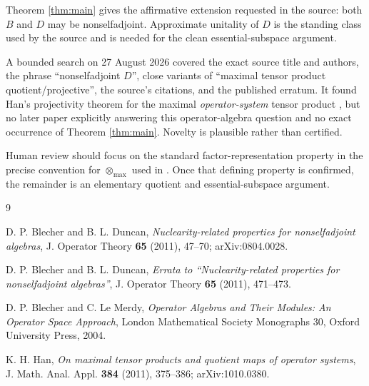 \documentclass[11pt]{article}
\newcommand{\otmax}{\mathbin{\otimes_{\max}}}
\begin{document}
Theorem \ref{thm:main} gives the affirmative extension requested in the
source: both $B$ and $D$ may be nonselfadjoint.  Approximate unitality of $D$
is the standing class used by the source and is needed for the clean
essential-subspace argument.

A bounded search on 27 August 2026 covered the exact source title and authors,
the phrase ``nonselfadjoint $D$'', close variants of ``maximal tensor product
quotient/projective'', the source's citations, and the published erratum.  It
found Han's projectivity theorem for the maximal \emph{operator-system}
tensor product \cite{Han}, but no later paper explicitly answering this
operator-algebra question and no exact occurrence of Theorem \ref{thm:main}.
Novelty is plausible rather than certified.

Human review should focus on the standard factor-representation property in
the precise convention for $\otmax$ used in \cite{BlecherDuncan}.  Once that
defining property is confirmed, the remainder is an elementary quotient and
essential-subspace argument.

\begin{thebibliography}{9}

D. P. Blecher and B. L. Duncan,
\emph{Nuclearity-related properties for nonselfadjoint algebras},
J. Operator Theory \textbf{65} (2011), 47--70;
arXiv:0804.0028.

D. P. Blecher and B. L. Duncan,
\emph{Errata to ``Nuclearity-related properties for nonselfadjoint
algebras''}, J. Operator Theory \textbf{65} (2011), 471--473.

D. P. Blecher and C. Le Merdy,
\emph{Operator Algebras and Their Modules: An Operator Space Approach},
London Mathematical Society Monographs 30, Oxford University Press, 2004.

K. H. Han,
\emph{On maximal tensor products and quotient maps of operator systems},
J. Math. Anal. Appl. \textbf{384} (2011), 375--386;
arXiv:1010.0380.

\end{thebibliography}
\end{document}
